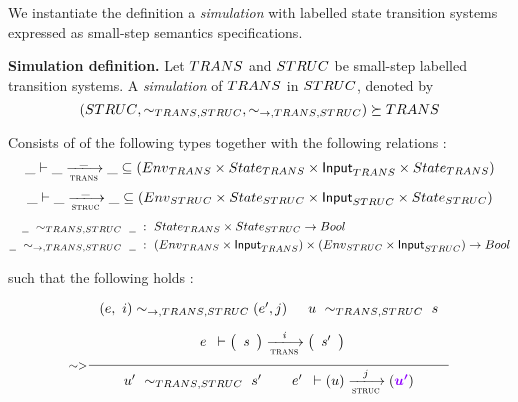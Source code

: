We instantiate the
definition a \emph{simulation} \cite{milner-pibook} with labelled
state transition systems expressed as small-step semantics specifications.

\textbf{Simulation definition.}
\label{def:simulation}
Let $\TRANS$ and $\STRUC$ be small-step labelled transition systems.
A \emph{simulation} of $\TRANS$ in $\STRUC$, denoted by
\[ (\STRUC, \sim_{\TRANS,\STRUC}, \sim_{\to,\TRANS,\STRUC}) \succeq \TRANS \]

Consists of of the following types together with the following relations :
\begin{equation*}
  \_ \vdash
  \var{\_} \trans{trans}{\_} \var{\_}
  \subseteq (\Env_{\TRANS} \times \State_{\TRANS} \times \Input_{\TRANS} \times \State_{\TRANS})
\end{equation*}
\begin{equation*}
  \_ \vdash
  \var{\_} \trans{struc}{\_} \var{\_}
  \subseteq (\Env_{\STRUC} \times \State_{\STRUC} \times \Input_{\STRUC} \times \State_{\STRUC})
\end{equation*}
\begin{align*}
  \wcard~\sim_{\TRANS,\STRUC}~\wcard ~&:~ \State_{\TRANS} \times \State_{\STRUC} \to \Bool \\
  \wcard~\sim_{\to,\TRANS,\STRUC} ~\wcard ~&:~ (\Env_{\TRANS} \times \Input_{\TRANS}) \times (\Env_{\STRUC} \times \Input_{\STRUC}) \to \Bool
\end{align*}

such that the following holds :
  \begin{equation}
    \inference[$\sim >$]
    {
      \\~\\
      (e,~i) \sim_{\to,\TRANS,\STRUC} (e', j) & u~\sim_{\TRANS,\STRUC}~s
      \\~\\
      {
        \begin{array}{c}
          e\\
        \end{array}
      }
      \vdash
      {
        \left(
          \begin{array}{r}
            \var{s} \\
          \end{array}
        \right)
      }
      \trans{trans}{\var{i}}
      {
        \left(
          \begin{array}{r}
            \var{s'} \\
          \end{array}
        \right)
      }
      \\~\\
    }
    {
      u'~\sim_{\TRANS,\STRUC}~s' ~~~~~
      \begin{array}{r}
        e'\\
      \end{array}
    \vdash
      (u)
      \trans{struc}{j}
      (\varUpdate{u'})
    }
  \end{equation}

